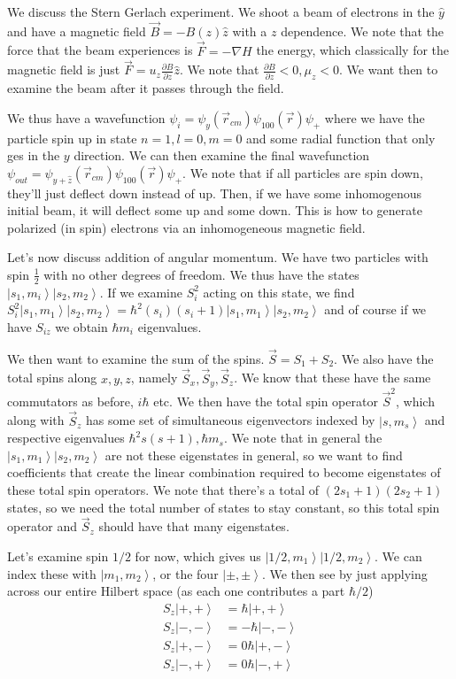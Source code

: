 \documentclass[10pt]{report}
\newcommand{\ket}[1]{\left|#1\right>}
\newcommand{\pd}[2]{\frac{\partial #1}{\partial#2}}
\begin{document}
We discuss the Stern Gerlach experiment. We shoot a beam of electrons in the $\hat{y}$ and have a magnetic field $\vec{B} = -B(z)\hat{z}$ with a $z$ dependence. We note that the force that the beam experiences is $\vec{F} = -\nabla H$ the energy, which classically for the magnetic field is just $\vec{F} = u_z \pd{B}{z}\hat{z}$. We note that $\pd{B}{z} < 0, \mu_z < 0$. We want then to examine the beam after it passes through the field.

We thus have a wavefunction $\psi_i = \psi_y(\vec{r}_{cm}) \psi_{100}(\vec{r}) \psi_+$ where we have the particle spin up in state $n=1, l=0, m=0$ and some radial function that only ges in the $y$ direction. We can then examine the final wavefunction $\psi_{out} = \psi_{y + \hat{z}}(\vec{r}_{cm})\psi_{100}(\vec{r})\psi_+$. We note that if all particles are spin down, they'll just deflect down instead of up. Then, if we have some inhomogenous initial beam, it will deflect some up and some down. This is how to generate polarized (in spin) electrons via an inhomogeneous magnetic field.

Let's now discuss addition of angular momentum. We have two particles with spin $\frac{1}{2}$ with no other degrees of freedom. We thus have the states $\ket{s_1, m_i}\ket{s_2, m_2}$. If we examine $S_i^2$ acting on this state, we find $S_i^2 \ket{s_1, m_1}\ket{s_2, m_2} = \hbar^2(s_i)(s_i+1)\ket{s_1, m_1}\ket{s_2, m_2}$ and of course if we have $S_{iz}$ we obtain $\hbar m_i$ eigenvalues. 

We then want to examine the sum of the spins. $\vec{S} = S_1 + S_2$. We also have the total spins along $x,y,z$, namely $\vec{S}_x, \vec{S}_y, \vec{S}_z$. We know that these have the same commutators as before, $i\hbar$ etc. We then have the total spin operator $\vec{S}^2$, which along with $\vec{S}_z$ has some set of simultaneous eigenvectors indexed by $\ket{s, m_s}$ and respective eigenvalues $\hbar^2 s(s+1), \hbar m_s$. We note that in general the $\ket{s_1, m_1}\ket{s_2, m_2}$ are not these eigenstates in general, so we want to find coefficients that create the linear combination required to become eigenstates of these total spin operators. We note that there's a total of $(2s_1 + 1)(2s_2+1)$ states, so we need the total number of states to stay constant, so this total spin operator and $\vec{S}_z$ should have that many eigenstates.

Let's examine spin $1/2$ for now, which gives us $\ket{1/2, m_1}\ket{1/2, m_2}$. We can index these with $\ket{m_1, m_2}$, or the four $\ket{\pm, \pm}$. We then see by just applying across our entire Hilbert space (as each one contributes a part $\hbar/2$)
\begin{align*}
    S_z \ket{+,+} &= \hbar\ket{+, +}\\
    S_z \ket{-,-} &= -\hbar\ket{-, -}\\
    S_z \ket{+,-} &= 0\hbar\ket{+, -}\\
    S_z \ket{-,+} &= 0\hbar\ket{-, +}
\end{align*}
\end{document}
